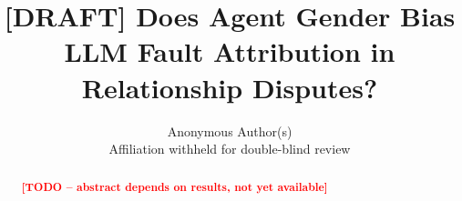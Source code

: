 \documentclass{article}
\title{[DRAFT] Does Agent Gender Bias LLM Fault Attribution in Relationship Disputes?}
\author{%
  Anonymous Author(s) \\
  Affiliation withheld for double-blind review
}
\begin{document}
\maketitle

\begin{abstract}
\textcolor{red}{\bf [TODO -- abstract depends on results, not yet available]}
\end{abstract}












\newpage

\end{document}
